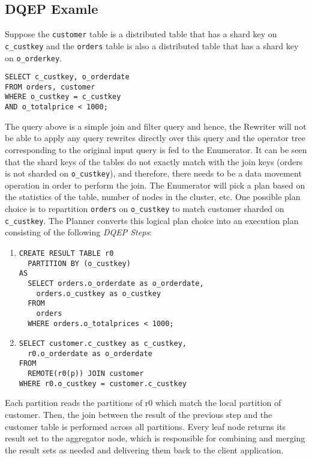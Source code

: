 \documentclass[11pt]{article}
\begin{document}
\subsection{DQEP Examle}
\label{sec:org4a34540}
Suppose the \texttt{customer} table is a distributed table that has a shard key on \texttt{c\_custkey} and the \texttt{orders}
table is also a distributed table that has a shard key on \texttt{o\_orderkey}.
\begin{verbatim}
SELECT c_custkey, o_orderdate
FROM orders, customer
WHERE o_custkey = c_custkey
AND o_totalprice < 1000;
\end{verbatim}
The query above is a simple join and filter query and hence, the Rewriter will not be able to apply
any query rewrites directly over this query and the operator tree corresponding to the original input
query is fed to the Enumerator. It can be seen that the shard keys of the tables do not exactly match
with the join keys (orders is not sharded on \texttt{o\_custkey}), and therefore, there needs to be a data
movement operation in order to perform the join. The Enumerator will pick a plan based on the
statistics of the table, number of nodes in the cluster, etc. One possible plan choice is to
repartition \texttt{orders} on \texttt{o\_custkey} to match customer sharded on \texttt{c\_custkey}. The Planner converts this
logical plan choice into an execution plan consisting of the following \emph{DQEP Steps}:
\begin{enumerate}
\item 
\begin{verbatim}
CREATE RESULT TABLE r0
  PARTITION BY (o_custkey)
AS
  SELECT orders.o_orderdate as o_orderdate,
    orders.o_custkey as o_custkey
  FROM
    orders
  WHERE orders.o_totalprices < 1000;
\end{verbatim}
\item 
\begin{verbatim}
SELECT customer.c_custkey as c_custkey,
  r0.o_orderdate as o_orderdate
FROM
  REMOTE(r0(p)) JOIN customer
WHERE r0.o_custkey = customer.c_custkey
\end{verbatim}
\end{enumerate}


Each partition reads the partitions of r0 which match the local partition of customer. Then, the join
between the result of the previous step and the customer table is performed across all partitions.
Every leaf node returns its result set to the aggregator node, which is responsible for combining and
merging the result sets as needed and delivering them back to the client application.
\end{document}
